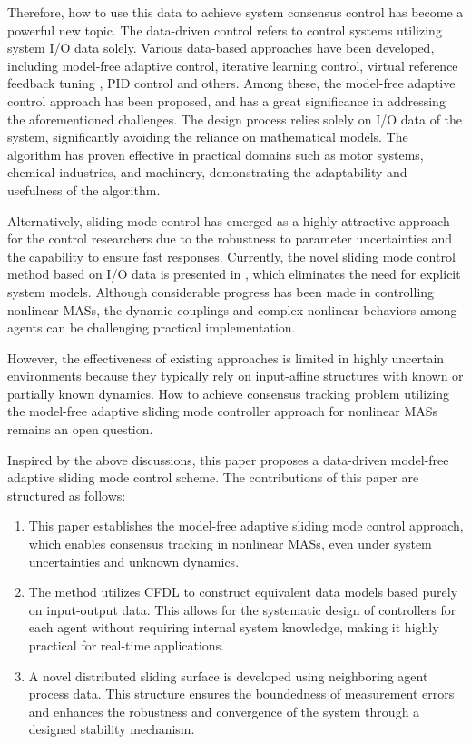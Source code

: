 \documentclass[journal,onecolumn]{IEEEtran}
\begin{document}
Therefore, how to use this data to achieve system consensus control has become a powerful new topic. The data-driven control \cite{17,18,19,20} refers to control systems utilizing system I/O data solely. Various data-based approaches have been developed, including model-free adaptive control, iterative learning control, virtual reference feedback tuning \cite{21}, PID control \cite{22} and others. Among these,  the model-free adaptive control approach \cite{23,24,25} has been proposed, and has a great significance in addressing the aforementioned challenges. The design process relies solely on I/O data of the system, significantly avoiding the reliance on mathematical models. The algorithm has proven effective in practical domains such as motor systems, chemical industries, and machinery, demonstrating the adaptability and usefulness of the algorithm. 

Alternatively, sliding mode control \cite{26} has emerged as a highly attractive approach for the control researchers due to the robustness to parameter uncertainties and the capability to ensure fast responses. Currently, the novel sliding mode control method based on I/O data is presented in \cite{27}, which eliminates the need for explicit system models. 
Although considerable progress has been made in controlling nonlinear MASs, the dynamic couplings and complex nonlinear behaviors among agents \cite{14} can be challenging practical implementation.

However, the effectiveness of existing approaches \cite{31,32,33,34} is limited in highly uncertain environments because they typically rely on input-affine structures with known or partially known dynamics.
How to achieve consensus tracking problem utilizing the model-free adaptive sliding mode controller approach for nonlinear MASs remains an open question.

Inspired by the above discussions, this paper proposes a data-driven model-free adaptive sliding mode control scheme. The contributions of this paper are structured as follows:

\begin{enumerate}

    \item This paper establishes the model-free adaptive sliding mode control approach, which enables consensus tracking in nonlinear MASs, even under system uncertainties and unknown dynamics.
    
    \item The method utilizes CFDL to construct equivalent data models based purely on input-output data. This allows for the systematic design of controllers for each agent without requiring internal system knowledge, making it highly practical for real-time applications.
    
    \item A novel distributed sliding surface is developed using neighboring agent process data. This structure ensures the boundedness of measurement errors and enhances the robustness and convergence of the system through a designed stability mechanism.

\end{enumerate}
\end{document}

